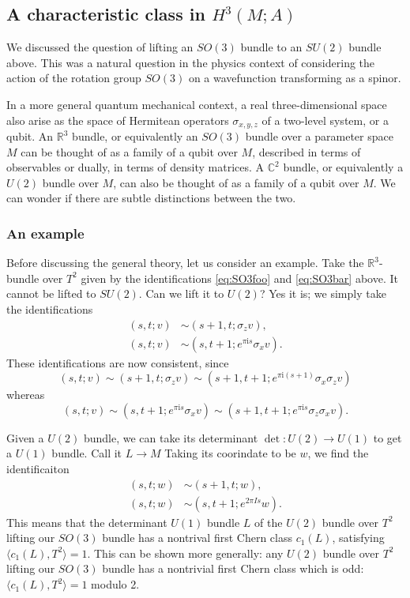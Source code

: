 \documentclass[12pt]{article}
\numberwithin{equation}{section}
\theoremstyle{remark}
\def\bC{\mathbb{C}}
\def\bR{\mathbb{R}}
\def\I{\mathrm{i}}
\begin{document}
\subsection{A characteristic class in $H^3(M;A)$}

We discussed the question of lifting an $SO(3)$ bundle to an $SU(2)$ bundle above.
This was a natural question in the physics context of considering 
the action of the rotation group $SO(3)$ on a wavefunction transforming as a spinor.

In a more general quantum mechanical context, a real three-dimensional space
also arise as the space of Hermitean operators $\sigma_{x,y,z}$
of a two-level system, or a qubit.
An $\bR^3$ bundle, or equivalently an $SO(3)$ bundle over a parameter space $M$
can be thought of as a family of a qubit over $M$,
described in terms of observables or dually, in terms of density matrices. 
A $\bC^2$ bundle, or equivalently a $U(2)$ bundle over $M$, 
can also be thought of as a family of a qubit over $M$.
We can wonder if there are subtle distinctions between the two.

\subsubsection{An example}

Before discussing the general theory, let us consider an example.
Take the $\bR^3$-bundle over $T^2$ given by the identifications \eqref{eq:SO3foo} and \eqref{eq:SO3bar} above.
It cannot be lifted to $SU(2)$. Can we lift it to $U(2)$?
Yes it is; we simply take the identifications \begin{align}
  (s,t;v) &\sim (s+1,t;\sigma_z v),\\
  (s,t;v) &\sim (s,t+1;e^{\pi \I s}\sigma_x v).
\end{align}
These identifications are now consistent, since \begin{equation}
  (s,t;v)\sim (s+1,t;\sigma_z v)\sim (s+1,t+1;e^{\pi \I (s+1)}\sigma_x\sigma_z v)
\end{equation} whereas \begin{equation}
  (s,t;v)\sim (s,t+1;e^{\pi \I s}\sigma_x v)\sim (s+1,t+1;e^{\pi \I s}\sigma_z\sigma_x v).
\end{equation}

Given a $U(2)$ bundle, we can take its determinant $\det:U(2)\to U(1)$ to get a $U(1)$ bundle. 
Call it $L\to M$ 
Taking its coorindate to be $w$, we find the identificaiton \begin{align}
  (s,t;w) &\sim (s+1,t;w),\\
  (s,t;w) &\sim (s,t+1;e^{2\pi I s}w).
\end{align}
This means that the determinant $U(1)$ bundle $L$ of the $U(2)$ bundle over $T^2$
lifting our $SO(3)$ bundle has a nontrival first Chern class $c_1(L)$,
satisfying $\langle c_1(L),T^2\rangle=1$.
This can be shown more generally:
any $U(2)$ bundle over $T^2$ lifting our $SO(3)$ bundle 
has a nontrivial first Chern class which is odd: $\langle c_1(L),T^2\rangle=1$ modulo 2.
\end{document}
